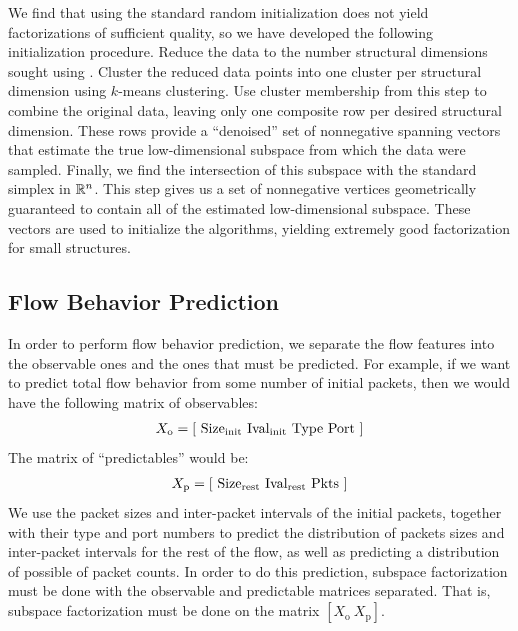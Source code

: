 \documentclass[conference]{IEEEtran}
\begin{document}

We find that using the standard random  initialization does not yield factorizations of sufficient quality, so we have developed the following initialization procedure.
Reduce the data to the number structural dimensions sought using .
Cluster the reduced data points into one cluster per structural dimension using $k$-means clustering.
Use cluster membership from this step to combine the original data, leaving only one composite row per desired structural dimension.
These rows provide a ``denoised'' set of nonnegative spanning vectors that estimate the true low-dimensional subspace from which the data were sampled.
Finally, we find the intersection of this subspace with the standard simplex in $\mathbb{R}^n$.\cddnote
This step gives us a set of nonnegative vertices geometrically guaranteed to contain all of the estimated low-dimensional subspace.
These vectors are used to initialize the  algorithms, yielding extremely good factorization for small structures.

\subsection{Flow Behavior Prediction}

In order to perform flow behavior prediction, we separate the flow features into the observable ones and the ones that must be predicted.
For example, if we want to predict total flow behavior from some number of initial packets, then we would have the following matrix of observables:
\begin{align}
  X_\text{o} = {\left[ ~
    \text{Size}_{\text{init}} ~
    \text{Ival}_{\text{init}} ~
    \text{Type} ~
    \text{Port} ~
  \right]}
\end{align}
The matrix of ``predictables'' would be:
\begin{align}
  X_\text{p} = {\left[ ~
    \text{Size}_{\text{rest}} ~
    \text{Ival}_{\text{rest}} ~
    \text{Pkts} ~
  \right]}
\end{align}
We use the packet sizes and inter-packet intervals of the initial packets, together with their  type and port numbers to predict the distribution of packets sizes and inter-packet intervals for the rest of the flow, as well as predicting a distribution of possible of packet counts.
In order to do this prediction, subspace factorization must be done with the observable and predictable matrices separated.
That is, subspace factorization must be done on the matrix $[X_\text{o}~X_\text{p}]$.
\end{document}
